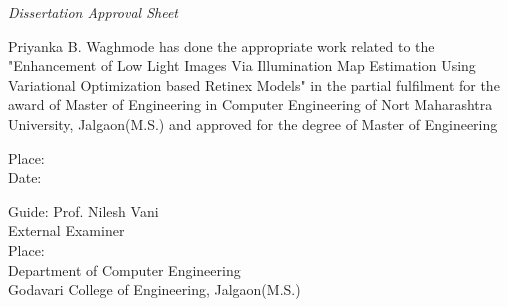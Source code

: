 \newpage
\thispagestyle{empty}

\begin{center}
\emph{\LARGE Dissertation Approval Sheet}\\[2.5cm]
\end{center}

\normalsize Priyanka B. Waghmode has done the appropriate work related to the "Enhancement of Low Light Images Via Illumination Map Estimation Using Variational Optimization based Retinex Models" in the partial fulfilment for the award of Master of Engineering in Computer Engineering of Nort Maharashtra University, Jalgaon(M.S.) and approved for the degree of Master of Engineering\\[1.0cm]

\begin{flushleft}
Place:\\
Date:
\end{flushleft}







\begin{flushleft}
Guide: Prof. Nilesh Vani\\[2cm]
External Examiner\\[1.5cm]
Place:\\
Department of Computer Engineering\\
Godavari College of Engineering, Jalgaon(M.S.) 
\end{flushleft}

